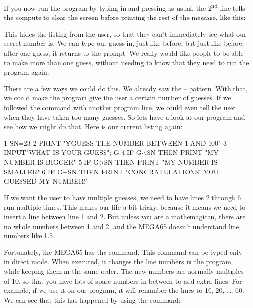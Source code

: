 
\needspace{2cm}
If you now run the program by typing in  and pressing
 as usual, the 2\textsuperscript{nd} line tells
the compute to clear the screen before printing the rest of the message, like this:


This hides the listing from the user, so that they can't immediately see
what our secret number is.  We can type our guess in, just like before,
but just like before, after one guess, it returns to the 
prompt.  We really would like people to be able to make more than one
guess, without needing to know that they need to run the program
again.

\needspace{3cm}
There are a few ways we could do this. We already saw the  --
 pattern. With that, we could make the program give the
user a certain number of guesses.  If we followed the 
command with another program line, we could even tell the user when
they have taken too many guesses.  So lets have a look at our
program and see how we might do that.  Here is our current listing again:

\begin{screenoutput}
1 SN=23
2 PRINT "ƳGUESS THE NUMBER BETWEEN 1 AND 100"
3 INPUT"WHAT IS YOUR GUESS"; G
4 IF G<SN THEN PRINT "MY NUMBER IS BIGGER"
5 IF G>SN THEN PRINT "MY NUMBER IS SMALLER"
6 IF G=SN THEN PRINT "CONGRATULATIONS! YOU GUESSED MY NUMBER!"
\end{screenoutput}

If we want the user to have multiple guesses, we need to have lines 2
through 6 run multiple times.  This makes our life a bit tricky,
because it means we need to insert a line between line 1 and 2. But
unless you are a mathemagican, there are no whole numbers between 1
and 2, and the MEGA65 doesn't understand line numbers like 1.5.

\needspace{4cm}
Fortunately, the MEGA65 has the
command.  This command can be typed only in direct mode. When
executed, it changes the line numbers in the program, while keeping
them in the same order.  The new numbers are normally multiples of 10,
so that you have lots of spare numbers in between to add extra lines.
For example, if we use it on our program, it will renumber the lines
to 10, 20, \ldots, 60. We can see that this has happened by using the
 command:

